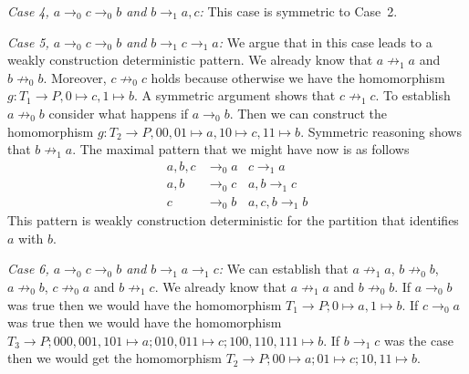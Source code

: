 \documentclass[a4paper]{article}
\newcommand{\case}[2]{\vspace{1ex}\noindent\textit{Case #1, #2:}}
\begin{document}
\case{4}{$a \rightarrow_0 c \rightarrow_0 b$ and $b \rightarrow_1 a,c$}
This case is symmetric to Case~2.

\case{5}{$a \rightarrow_0 c \rightarrow_0 b$ and $b \rightarrow_1 c
\rightarrow_1 a$}
We argue that in this case leads to a weakly construction deterministic
pattern. We already know that $a \not \rightarrow_1 a$ and $b \not
\rightarrow_0 b$. Moreover, $c \not \rightarrow_0 c$ holds because
otherwise we have the homomorphism $g : T_1 \to P, 0 \mapsto c, 1
\mapsto b$. A symmetric argument shows that $c \not \rightarrow_1 c$. To
establish $a \not \rightarrow_0 b$ consider what happens if $a
\rightarrow_0 b$. Then we can construct the homomorphism $g : T_2 \to P,
00, 01 \mapsto a, 10 \mapsto c, 11 \mapsto b$. Symmetric reasoning shows
that $b \not \rightarrow_1 a$. The maximal pattern that we might have
now is as follows
\begin{align*}
 a,b,c & \rightarrow_0 a & c \rightarrow_1 a \\
 a,b & \rightarrow_0 c & a,b \rightarrow_1 c \\
 c & \rightarrow_0 b & a,c,b \rightarrow_1 b
\end{align*}
This pattern is weakly construction deterministic for the partition that
identifies $a$ with $b$.

\case{6}{$a \rightarrow_0 c \rightarrow_0 b$ and $b \rightarrow_1 a
\rightarrow_1 c$}
We can establish that $a \not \rightarrow_1 a$, $b \not \rightarrow_0
b$, $a \not \rightarrow_0 b$, $c \not \rightarrow_0 a$ and $b \not
\rightarrow_1 c$. We already know that $a \not \rightarrow_1 a$ and $b
\not \rightarrow_0 b$. If $a \rightarrow_0 b$ was true then we would
have the homomorphism $T_1 \to P; 0 \mapsto a, 1 \mapsto b$. If $c
\rightarrow_0 a$ was true then we would have the homomorphism $T_3 \to
P; 000,001,101 \mapsto a; 010,011 \mapsto c; 100,110,111 \mapsto b$. If
$b \rightarrow_1 c$ was the case then we would get the homomorphism $T_2
\to P; 00 \mapsto a; 01 \mapsto c; 10,11 \mapsto b$.

% 
% 
% 
\end{document}
